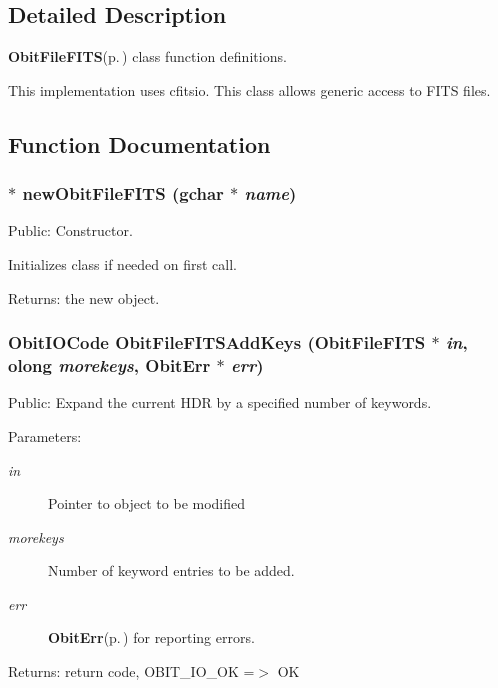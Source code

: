 \subsection{Detailed Description}
{\bf Obit\-File\-FITS}{\rm (p.\,\pageref{structObitFileFITS})} class function definitions. 

This implementation uses cfitsio. This class allows generic access to FITS files.

\subsection{Function Documentation}
\subsubsection{$\ast$ new\-Obit\-File\-FITS (gchar $\ast$ {\em name})}\label{ObitFileFITS_8c_a7}


Public: Constructor. 

Initializes class if needed on first call. \begin{Desc}
\item[Returns:]the new object. \end{Desc}
\subsubsection{\setlength{\rightskip}{0pt plus 5cm}Obit\-IOCode Obit\-File\-FITSAdd\-Keys ({\bf Obit\-File\-FITS} $\ast$ {\em in}, {\bf olong} {\em morekeys}, {\bf Obit\-Err} $\ast$ {\em err})}\label{ObitFileFITS_8c_a27}


Public: Expand the current HDR by a specified number of keywords. 

\begin{Desc}
\item[Parameters:]
\begin{description}
\item[{\em in}]Pointer to object to be modified \item[{\em morekeys}]Number of keyword entries to be added. \item[{\em err}]{\bf Obit\-Err}{\rm (p.\,\pageref{structObitErr})} for reporting errors. \end{description}
\end{Desc}
\begin{Desc}
\item[Returns:]return code, OBIT\_\-IO\_\-OK =$>$ OK \end{Desc}
